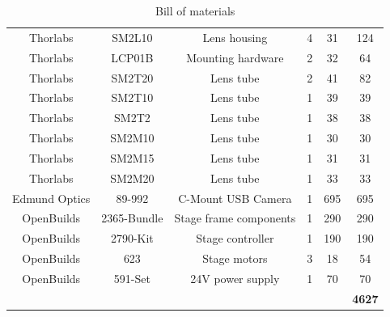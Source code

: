 \documentclass{article}
\begin{document}
\begin{table}[!h]
\begin{tabular}{cccccc}
Thorlabs        & SM2L10               & Lens housing                            & 4            & 31                        & 124                     \\
Thorlabs        & LCP01B               & Mounting hardware                       & 2            & 32                        & 64                      \\
Thorlabs        & SM2T20               & Lens tube                               & 2            & 41                        & 82                      \\
Thorlabs        & SM2T10               & Lens tube                               & 1            & 39                        & 39                      \\
Thorlabs        & SM2T2                & Lens tube                               & 1            & 38                        & 38                      \\
Thorlabs        & SM2M10               & Lens tube                               & 1            & 30                        & 30                      \\
Thorlabs        & SM2M15               & Lens tube                               & 1            & 31                        & 31                      \\
Thorlabs        & SM2M20               & Lens tube                               & 1            & 33                        & 33                      \\
Edmund Optics   & 89-992               & C-Mount USB Camera                      & 1            & 695                       & 695                     \\
OpenBuilds      & 2365-Bundle          & Stage frame components & 1            & 290                       & 290                     \\
OpenBuilds      & 2790-Kit             & Stage controller                        & 1            & 190                       & 190                     \\
OpenBuilds      & 623                  & Stage motors                            & 3            & 18                        & 54                      \\
OpenBuilds      & 591-Set              & 24V power supply                        & 1            & 70                        & 70                      \\
                &                      &                                         &              &                           & \textbf{4627}          
\end{tabular}
\caption{Bill of materials}
\end{table}
\end{document}
